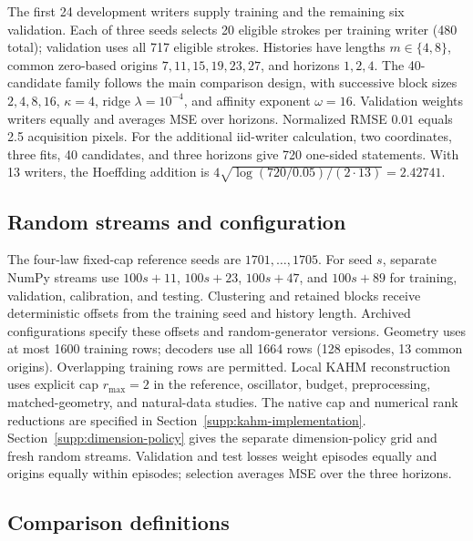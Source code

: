The first 24 development writers supply training and the remaining six
validation. Each of three seeds selects 20 eligible strokes per training
writer (480 total); validation uses all 717 eligible strokes. Histories have
lengths $m\in\{4,8\}$, common zero-based origins $7,11,15,19,23,27$, and
horizons $1,2,4$. The 40-candidate family follows the main comparison design,
with successive block sizes $2,4,8,16$, $\kappa=4$, ridge $\lambda=10^{-4}$,
and affinity exponent $\omega=16$. Validation weights writers equally and
averages MSE over horizons. Normalized RMSE $0.01$ equals 2.5 acquisition pixels.
For the additional iid-writer calculation, two coordinates, three fits,
40 candidates, and three horizons give 720 one-sided statements. With
13 writers, the Hoeffding addition is
$4\sqrt{\log(720/0.05)/(2\cdot13)}=2.42741$.

\subsection{Random streams and configuration}

The four-law fixed-cap reference seeds are $1701,\ldots,1705$.
For seed $s$, separate NumPy
streams use $100s+11$, $100s+23$, $100s+47$, and $100s+89$ for training,
validation, calibration, and testing. Clustering and retained blocks receive
deterministic offsets from the training seed and history length. Archived
configurations specify these offsets and random-generator versions.
Geometry uses at most 1600 training rows; decoders use all 1664 rows
(128 episodes, 13 common origins). Overlapping training rows are permitted.
Local KAHM reconstruction uses explicit cap $r_{\max}=2$ in the reference,
oscillator, budget, preprocessing, matched-geometry, and natural-data studies.
The native cap and numerical rank reductions are specified in
Section~\ref{supp:kahm-implementation}. Section~\ref{supp:dimension-policy} gives the separate
dimension-policy grid and fresh random streams.
Validation and test losses weight episodes equally and origins equally
within episodes; selection averages MSE over the three horizons.

\subsection{Comparison definitions}


